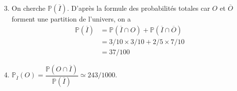 \documentclass[15pt, mathserif]{beamer}
\newcommand{\Prem}{\mathbb{P}}	%
\begin{document}
 \begin{frame}  
 \begin{enumerate} \setcounter{enumi}{2}  
 	 \item On cherche $\Prem(\overline{I})$. D'après la formule des probabilités totales car $O$ et $\overline{O}$ forment une partition de l'univers, on a \begin{align*} \Prem(\overline{I}) &= \Prem(\overline{I } \cap O) + \Prem(\overline{I } \cap \overline{O}) \\ 
 &= 3/10\times 3/10+ 2/5\times 7/10 \\ 
 &= 37/100
 \end{align*}
  
 \item $\Prem_{\overline{I}}(O)=\dfrac{\Prem(O\cap \overline{I})}{\Prem(\overline{I})} \simeq 243/1000$.
 \end{enumerate}\end{frame}
\end{document}
